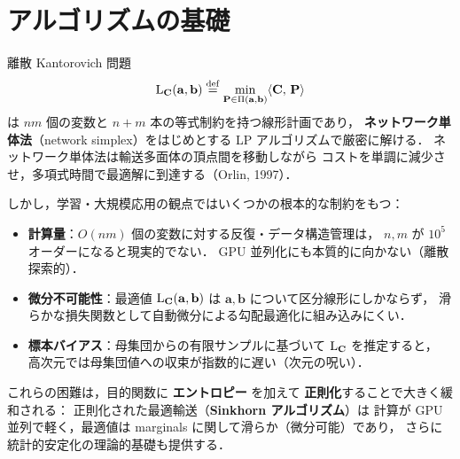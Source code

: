 \chapter{アルゴリズムの基礎}
\label{ch:seminar-02}

離散 Kantorovich 問題
\[
  \mathrm{L}_{\mathbf{C}}(\mathbf{a}, \mathbf{b})
  \overset{\mathrm{def}}{=} \min_{\mathbf{P} \in \Pi(\mathbf{a}, \mathbf{b})}
  \langle \mathbf{C},\, \mathbf{P} \rangle
\]
は $nm$ 個の変数と $n + m$ 本の等式制約を持つ線形計画であり，
\textbf{ネットワーク単体法}（network simplex）をはじめとする
LP アルゴリズムで厳密に解ける．
ネットワーク単体法は輸送多面体の頂点間を移動しながら
コストを単調に減少させ，多項式時間で最適解に到達する（Orlin, 1997）．

しかし，学習・大規模応用の観点ではいくつかの根本的な制約をもつ：

\begin{itemize}
  \item \textbf{計算量}：$O(nm)$ 個の変数に対する反復・データ構造管理は，
    $n, m$ が $10^5$ オーダーになると現実的でない．
    GPU 並列化にも本質的に向かない（離散探索的）．
  \item \textbf{微分不可能性}：最適値 $\mathrm{L}_{\mathbf{C}}(\mathbf{a}, \mathbf{b})$ は
    $\mathbf{a}, \mathbf{b}$ について区分線形にしかならず，
    滑らかな損失関数として自動微分による勾配最適化に組み込みにくい．
  \item \textbf{標本バイアス}：母集団からの有限サンプルに基づいて
    $\mathrm{L}_{\mathbf{C}}$ を推定すると，
    高次元では母集団値への収束が指数的に遅い（次元の呪い）．
\end{itemize}

これらの困難は，目的関数に \textbf{エントロピー} を加えて
\textbf{正則化}することで大きく緩和される：
正則化された最適輸送（\textbf{Sinkhorn アルゴリズム}）は
計算が GPU 並列で軽く，最適値は marginals に関して滑らか（微分可能）であり，
さらに統計的安定化の理論的基礎も提供する．

